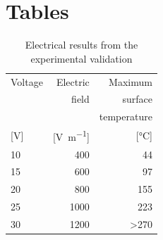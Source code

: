 \documentclass[11pt,review,times]{elsarticle}
\begin{document}
\FloatBarrier
\clearpage
							\section*{Tables}
\FloatBarrier

\begin{table}[htb]
\centering
\begin{tabular}{@{}lrr@{}}
\toprule
Voltage 				& Electric							& Maximum  				\\ 
 						& field								& surface 				\\ 
 						& 										& temperature 			\\
{[}\si{\volt}{]} 	& {[}\si{\volt\per\metre}{]} 	& {[}\si{\celsius}{]}	\\ \midrule
10 						& 400									& 44 						\\
15						& 600									& 97 						\\
20 						& 800									& 155 						\\
25 						& 1000									& 223 						\\
30 						& 1200									& \textgreater 270 	\\ \bottomrule
\end{tabular}%
\caption{Electrical results from the experimental validation}
\label{tab:results_lab}
\end{table}

\begin{table}[H]
\centering
{}
\caption{LSS and fractography analysis reported as average values $\pm$ standard deviation \cite{Brassard2018_figshare_article1}}
\label{tab:SLS_and_fractography_results}
\end{table}


\FloatBarrier
\clearpage



\end{document}
